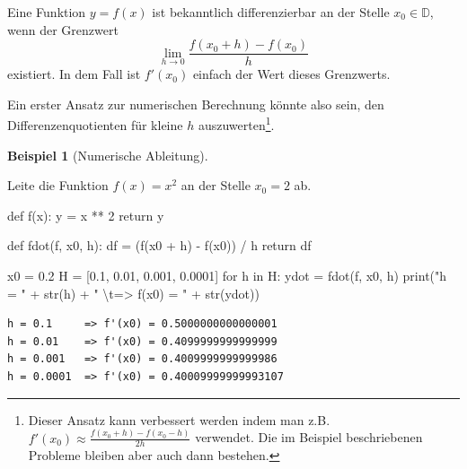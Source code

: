 \documentclass[
  letterpaper,
  DIV=11,
  oneside]{scrreprt}
\newenvironment{Shaded}{\begin{snugshade}}{\end{snugshade}}
\newcommand{\BuiltInTok}[1]{\textcolor[rgb]{0.00,0.23,0.31}{#1}}
\newcommand{\CharTok}[1]{\textcolor[rgb]{0.13,0.47,0.30}{#1}}
\newcommand{\ControlFlowTok}[1]{\textcolor[rgb]{0.00,0.23,0.31}{#1}}
\newcommand{\DecValTok}[1]{\textcolor[rgb]{0.68,0.00,0.00}{#1}}
\newcommand{\FloatTok}[1]{\textcolor[rgb]{0.68,0.00,0.00}{#1}}
\newcommand{\KeywordTok}[1]{\textcolor[rgb]{0.00,0.23,0.31}{#1}}
\newcommand{\NormalTok}[1]{\textcolor[rgb]{0.00,0.23,0.31}{#1}}
\newcommand{\OperatorTok}[1]{\textcolor[rgb]{0.37,0.37,0.37}{#1}}
\newcommand{\StringTok}[1]{\textcolor[rgb]{0.13,0.47,0.30}{#1}}
\theoremstyle{definition}
\theoremstyle{definition}
\newtheorem{example}{Beispiel}[chapter]
\theoremstyle{remark}
\begin{document}
Eine Funktion \(y = f(x)\) ist bekanntlich differenzierbar an der Stelle
\(x_0 \in \mathbb{D}\), wenn der Grenzwert
\[ \lim_{h\rightarrow 0} \frac{f(x_0 + h) - f(x_0)}{h} \] existiert. In
dem Fall ist \(f'(x_0)\) einfach der Wert dieses Grenzwerts.

Ein erster Ansatz zur numerischen Berechnung könnte also sein, den
Differenzenquotienten für kleine \(h\) auszuwerten\footnote{Dieser
  Ansatz kann verbessert werden indem man z.B.
  \(f'(x_0) \approx \frac{f(x_0 + h) - f(x_0 - h)}{2h}\) verwendet. Die
  im Beispiel beschriebenen Probleme bleiben aber auch dann bestehen.}.

\leavevmode{}%
\begin{example}[Numerische Ableitung]\label{exm-numDiff}

Leite die Funktion \(f(x) = x^2\) an der Stelle \(x_0 = 2\) ab.

\begin{Shaded}
\begin{Highlighting}[]
\KeywordTok{def}\NormalTok{ f(x):}
\NormalTok{    y }\OperatorTok{=}\NormalTok{ x }\OperatorTok{**} \DecValTok{2}
    \ControlFlowTok{return}\NormalTok{ y}

\KeywordTok{def}\NormalTok{ fdot(f, x0, h):}
\NormalTok{    df }\OperatorTok{=}\NormalTok{ (f(x0 }\OperatorTok{+}\NormalTok{ h) }\OperatorTok{{-}}\NormalTok{ f(x0)) }\OperatorTok{/}\NormalTok{ h}
    \ControlFlowTok{return}\NormalTok{ df}

\NormalTok{x0 }\OperatorTok{=} \FloatTok{0.2}
\NormalTok{H }\OperatorTok{=}\NormalTok{ [}\FloatTok{0.1}\NormalTok{, }\FloatTok{0.01}\NormalTok{, }\FloatTok{0.001}\NormalTok{, }\FloatTok{0.0001}\NormalTok{]}
\ControlFlowTok{for}\NormalTok{ h }\KeywordTok{in}\NormalTok{ H:}
\NormalTok{    ydot }\OperatorTok{=}\NormalTok{ fdot(f, x0, h)}
    \BuiltInTok{print}\NormalTok{(}\StringTok{"h = "} \OperatorTok{+} \BuiltInTok{str}\NormalTok{(h) }\OperatorTok{+} \StringTok{" }\CharTok{\textbackslash{}t}\StringTok{=\textgreater{} f\textquotesingle{}(x0) = "} \OperatorTok{+} \BuiltInTok{str}\NormalTok{(ydot))}
\end{Highlighting}
\end{Shaded}

\begin{verbatim}
h = 0.1     => f'(x0) = 0.5000000000000001
h = 0.01    => f'(x0) = 0.4099999999999999
h = 0.001   => f'(x0) = 0.4009999999999986
h = 0.0001  => f'(x0) = 0.40009999999993107
\end{verbatim}


\end{example}
\end{document}
